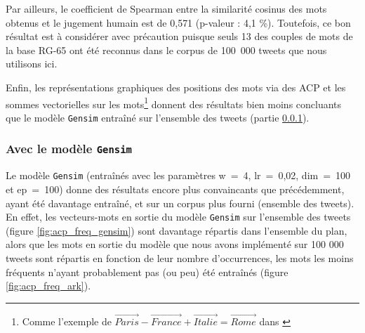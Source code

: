 \documentclass[11pt,french,french]{article}
\let\rmarkdownfootnote\footnote%
\def\footnote{\protect\rmarkdownfootnote}
\begin{document}
Par ailleurs, le coefficient de Spearman entre la similarité cosinus des
mots obtenus et le jugement humain est de 0,571 (p-valeur : 4,1 \%).
Toutefois, ce bon résultat est à considérer avec précaution puisque
seuls 13 des couples de mots de la base RG-65 ont été reconnus dans le
corpus de 100~000 tweets que nous utilisons ici.

Enfin, les représentations graphiques des positions des mots via des ACP
et les sommes vectorielles sur les mots\footnote{Comme l'exemple de
  \(\overrightarrow{Paris} - \overrightarrow{France} + \overrightarrow{Italie} = \overrightarrow{Rome}\)
  dans \cite{Mikolov}} donnent des résultats bien moins concluants que
le modèle \texttt{Gensim} entraîné sur l'ensemble des tweets (partie
\ref{sec:gensimresultats}).

\subsubsection{\texorpdfstring{Avec le modèle
\texttt{Gensim}}{Avec le modèle Gensim}}\label{sec:gensimresultats}

Le modèle \texttt{Gensim} (entraînés avec les paramètres w~=~4,
lr~=~0,02, dim~=~100 et ep~=~100) donne des résultats encore plus
convaincants que précédemment, ayant été davantage entraîné, et sur un
corpus plus fourni (ensemble des tweets). En effet, les vecteurs-mots en
sortie du modèle \texttt{Gensim} sur l'ensemble des tweets (figure
\ref{fig:acp_freq_gensim}) sont davantage répartis dans l'ensemble du
plan, alors que les mots en sortie du modèle que nous avons implémenté
sur 100 000 tweets sont répartis en fonction de leur nombre
d'occurrences, les mots les moins fréquents n'ayant probablement pas (ou
peu) été entraînés (figure \ref{fig:acp_freq_ark}).
\end{document}
